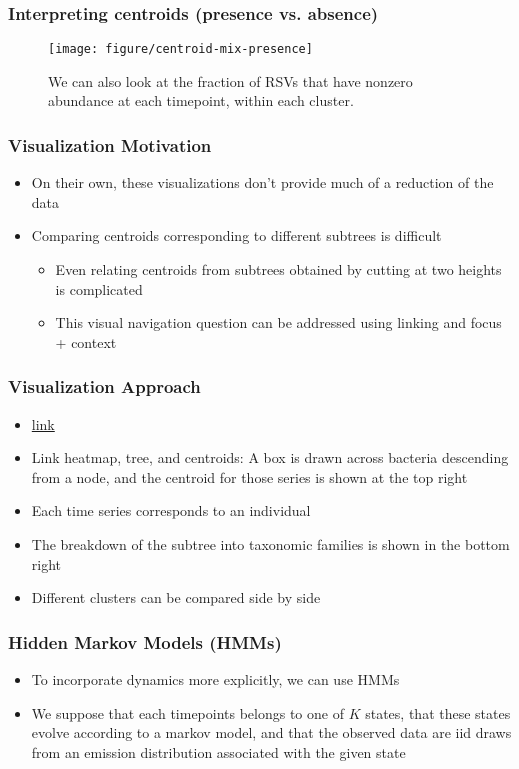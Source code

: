 \documentclass{beamer}
\begin{document}
\begin{frame}
  \frametitle{Interpreting centroids (presence vs. absence)}
\begin{figure}[ht]
  \centering
  \texttt{[image: figure/centroid-mix-presence]}
  \caption{We can also look at the fraction of RSVs that have nonzero abundance
    at each timepoint, within each cluster. \label{fig:centroid-mix-presence} }
\end{figure}
\end{frame}

\begin{frame}
  \frametitle{Visualization Motivation}
  \begin{itemize}
  \item On their own, these visualizations don't provide much of a reduction of the data
  \item Comparing centroids corresponding to different subtrees is difficult
    \begin{itemize}
    \item Even relating centroids from subtrees obtained by cutting at two heights is complicated
    \item This visual navigation question can be addressed using linking and focus + context
    \end{itemize}
  \end{itemize}
\end{frame}

\begin{frame}
  \frametitle{Visualization Approach}
  \begin{itemize}
  \item \href{/Users/krissankaran/Desktop/100_days/july3/hclust.html}{link}
  \item Link heatmap, tree, and centroids: A box is drawn across bacteria descending from a node, and the centroid for those series is shown at the top right
  \item Each time series corresponds to an individual
  \item The breakdown of the subtree into taxonomic families is shown in the bottom right
  \item Different clusters can be compared side by side
  \end{itemize} 
\end{frame}

\begin{frame}
  \frametitle{Hidden Markov Models (HMMs)}
  \begin{itemize}
  \item To incorporate dynamics more explicitly, we can use HMMs
  \item We suppose that each timepoints belongs to one of $K$ states, that these
    states evolve according to a markov model, and that the observed data are iid
    draws from an emission distribution associated with the given state
  \end{itemize}
\end{frame}
\end{document}
